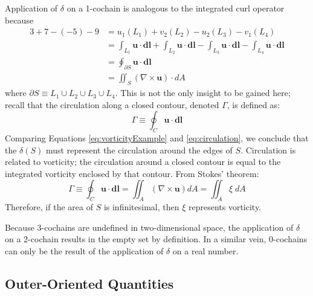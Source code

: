 Application of $\delta$ on a 1-cochain is analogous to the integrated curl operator because
\begin{equation}
    \begin{split}
        3 + 7 - (-5) - 9 &= u_1(L_1) + v_2(L_2) - u_2(L_3) - v_1(L_4) \\
        &= \int_{L_1} \mathbf{u} \cdot \mathbf{dl} + \int_{L_2} \mathbf{u} \cdot \mathbf{dl} - \int_{L_3} \mathbf{u} \cdot \mathbf{dl} - \int_{L_4} \mathbf{u} \cdot \mathbf{dl} \\
        &= \oint_{\partial S} \mathbf{u} \cdot \mathbf{dl} \\
        &= \iint_{S} \left( \nabla \times \mathbf{u} \right) \cdot dA
    \end{split}
    \label{eq:vorticityExample}
\end{equation}
where $\partial S \equiv L_1 \cup L_2 \cup L_3 \cup L_4$. This is not the only insight to be gained here; recall that the circulation along a closed contour, denoted $\Gamma$, is defined as:
\begin{equation}
    \Gamma \equiv \oint_C \mathbf{u} \cdot \mathbf{dl}
    \label{eq:circulation}
\end{equation}
Comparing Equations \eqref{eq:vorticityExample} and \eqref{eq:circulation}, we conclude that the $\delta(S)$ must represent the circulation around the edges of $S$. Circulation is related to vorticity; the circulation around a closed contour is equal to the integrated vorticity enclosed by that contour. From Stokes' theorem:
\begin{equation}
    \Gamma \equiv \oint_C \mathbf{u} \cdot \mathbf{dl} = \iint_A \left( \nabla \times \mathbf{u} \right) dA = \iint_A \xi \; dA
\end{equation}
Therefore, if the area of $S$ is infinitesimal, then $\xi$ represents vorticity.

Because $3$-cochains are undefined in two-dimensional space, the application of $\delta$ on a 2-cochain results in the empty set by definition. In a similar vein, 0-cochains can only be the result of the application of $\delta$ on a real number.

\subsection{Outer-Oriented Quantities}

